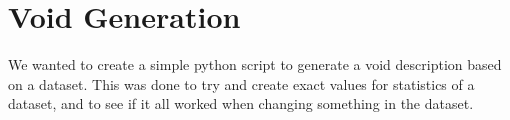 \section{Void Generation}\label{sec:void}


We wanted to create a simple python script to generate a void description based on a dataset. This was done to try and create exact values for statistics of a dataset, and to see if it all worked when changing something in the dataset.